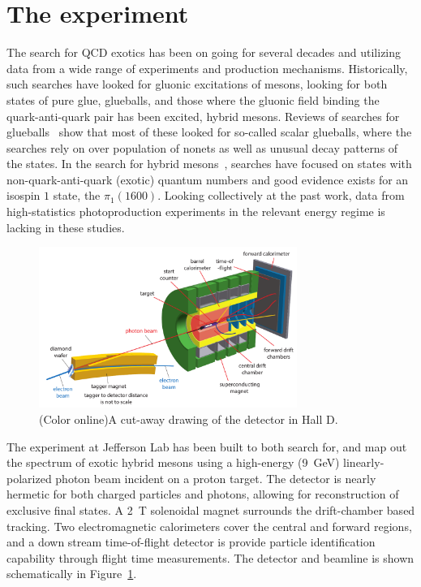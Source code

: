 \section[The \gx{} experiment (Curtis)]{\label{sec:gluexexperiment} The \gx{} experiment}
The search for QCD exotics has been on going for several decades and utilizing data from a wide range of experiments and production mechanisms. Historically, such searches have looked for gluonic excitations of mesons, looking for both states of pure glue, glueballs, and those where the gluonic field binding the quark-anti-quark pair has been excited, hybrid mesons. Reviews of searches for glueballs~\cite{Crede:2008vw} show that most of these looked for so-called scalar glueballs, where the searches rely on over population of nonets as well as unusual decay patterns of the states. In the search for hybrid mesons~\cite{Meyer:2010ku,Meyer:2015eta}, searches have focused on states with non-quark-anti-quark (exotic) quantum numbers and good evidence exists for an isospin $1$ state, the $\pi_{1}(1600)$. Looking collectively at the past work, data from high-statistics photoproduction experiments in the relevant energy regime is lacking in these studies. 

\begin{figure}[h!]\centering
\includegraphics[width=0.75\textwidth]{figures/detector_beamline_noplug_noGlueX.pdf}
\caption[]{\label{fig:gluex_cut-away}(Color online)A cut-away drawing of the \GX{} detector in Hall D.}
\end{figure}
The \gx{} experiment at Jefferson Lab has been built to both search for, and map out the spectrum of exotic hybrid mesons using a high-energy (9~GeV) linearly-polarized photon beam incident on a proton target\cite{gluex-ref}. The detector is nearly hermetic for both charged particles and photons, allowing for reconstruction of exclusive final states. A 2~T solenoidal magnet surrounds the drift-chamber based tracking. Two electromagnetic calorimeters cover the central and forward regions, and a down stream time-of-flight detector is provide particle identification capability through flight time measurements. The \gx{} detector and beamline is shown schematically in Figure~\ref{fig:gluex_cut-away}.



